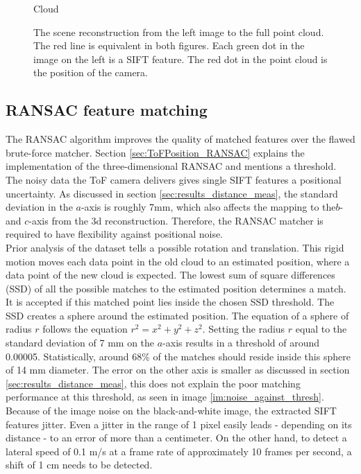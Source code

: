 \begin{figure}[H]
\begin{minipage}[b]{0.45\textwidth}
      \caption{Cloud}
      \label{fig:linearity3d_cloud} 
    \end{minipage}
    \caption{The scene reconstruction from the left image to the full point cloud. The red line is equivalent in both figures. Each green dot in the image on the left is a SIFT feature. The red dot in the point cloud is the position of the camera.}
    \label{fig:linearity3d}
  \end{figure}
\subsection{RANSAC feature matching}
\label{sec:RANSAC_Results}
The RANSAC algorithm improves the quality of matched features over the flawed brute-force matcher. Section \ref{sec:ToFPosition_RANSAC} explains the implementation of the three-dimensional RANSAC and mentions a threshold. The noisy data the ToF camera delivers gives single SIFT features a positional uncertainty. As discussed in section \ref{sec:results_distance_meas}, the standard deviation in the $a$-axis is roughly 7mm, which also affects the mapping to the$b$- and $c$-axis from the 3d reconstruction. Therefore, the RANSAC matcher is required to have flexibility against positional noise.\\
Prior analysis of the dataset tells a possible rotation and translation. This rigid motion moves each data point in the old cloud to an estimated position, where a data point of the new cloud is expected.  The lowest sum of square differences (SSD) of all the possible matches to the estimated position determines a match. It is accepted if this matched point lies inside the chosen SSD threshold. 
The SSD creates a sphere around the estimated position. The equation of a sphere of radius $r$ follows the equation $r^{2}=x^{2}+y^{2}+z^{2}$. Setting the radius $r$ equal to the standard deviation of 7 mm on the $a$-axis results in a threshold of around 0.00005. Statistically, around 68\% of the matches should reside inside this sphere of 14 mm diameter. The error on the other axis is smaller as discussed in section \ref{sec:results_distance_meas}, this does not explain the poor matching performance at this threshold, as seen in image \ref{im:noise_against_thresh}. Because of the image noise on the black-and-white image, the extracted SIFT features jitter. Even a jitter in the range of 1 pixel easily leads - depending on its distance - to an error of more than a centimeter. On the other hand, to detect a lateral speed of 0.1 m/s at a frame rate of approximately 10 frames per second, a shift of 1 cm needs to be detected.
